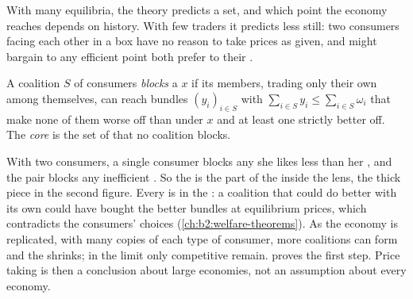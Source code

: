 With many equilibria, the theory predicts a set, and which point the economy reaches depends on history.
With few traders it predicts less still: two consumers facing each other in a box have no reason to take
prices as given, and might bargain to any efficient point both prefer to their .

\begin{definition}[Core]\label{def:b2:exchange-economies:core}
A coalition $S$ of consumers \emph{blocks} a  $x$ if its members, trading only their
own  among themselves, can reach bundles $(y_i)_{i \in S}$ with $\sum_{i \in S} y_i \le
\sum_{i \in S}\omega_i$ that make none of them worse off than under $x$ and at least one strictly better
off. The \emph{core} is the set of  that no coalition blocks.
\end{definition}

With two consumers, a single consumer blocks any  she likes less than her , and the
pair blocks any inefficient . So the  is the part of the  inside the lens,
the thick piece in the second figure. Every  is in the : a coalition that
could do better with its own  could have bought the better bundles at equilibrium prices,
which contradicts the consumers' choices (\cref{ch:b2:welfare-theorems}). As the economy is replicated,
with many copies of each type of consumer, more coalitions can form and the  shrinks; in the limit
only competitive  remain.  proves the first step. Price
taking is then a conclusion about large economies, not an assumption about every economy.

